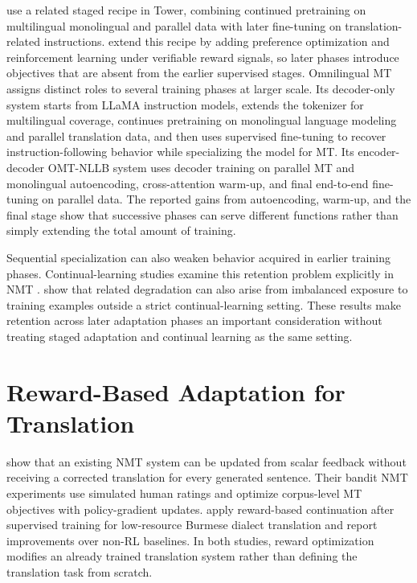 \citet{alves2024toweropenmultilingual} use a related staged recipe in Tower,
combining continued pretraining on multilingual monolingual and parallel data
with later fine-tuning on translation-related instructions.
\citet{rei2025towerbridginggenerality} extend this recipe by adding preference
optimization and reinforcement learning under verifiable reward signals, so
later phases introduce objectives that are absent from the earlier supervised
stages. Omnilingual MT
\citep{omnilingualmtteam2026omnilingualmtmachinetranslation} assigns distinct
roles to several training phases at larger scale. Its decoder-only system
starts from LLaMA instruction models, extends the tokenizer for multilingual
coverage, continues pretraining on monolingual language modeling and parallel
translation data, and then uses supervised fine-tuning to recover
instruction-following behavior while specializing the model for MT. Its
encoder-decoder OMT-NLLB system uses decoder training on parallel MT and
monolingual autoencoding, cross-attention warm-up, and final end-to-end
fine-tuning on parallel data. The reported gains from autoencoding, warm-up,
and the final stage show that successive phases can serve different functions
rather than simply extending the total amount of training.

Sequential specialization can also weaken behavior acquired in earlier
training phases. Continual-learning studies examine this retention problem
explicitly in NMT
\citep{cao-etal-2021-continual,gu-feng-2020-investigating,gu-etal-2022-continual}.
\citet{shao-feng-2022-overcoming} show that related degradation can also arise
from imbalanced exposure to training examples outside a strict
continual-learning setting. These results make retention across later
adaptation phases an important consideration without treating staged
adaptation and continual learning as the same setting.

\section{Reward-Based Adaptation for Translation}
\label{sec:rw-reward-based-ft-translation}

\citet{nguyen-etal-2017-reinforcement} show that an existing NMT system can be
updated from scalar feedback without receiving a corrected translation for
every generated sentence. Their bandit NMT experiments use simulated human
ratings and optimize corpus-level MT objectives with policy-gradient updates.
\citet{thu2023rlnmt} apply reward-based continuation after supervised training
for low-resource Burmese dialect translation and report improvements over
non-RL baselines. In both studies, reward optimization modifies an already
trained translation system rather than defining the translation task from
scratch.

